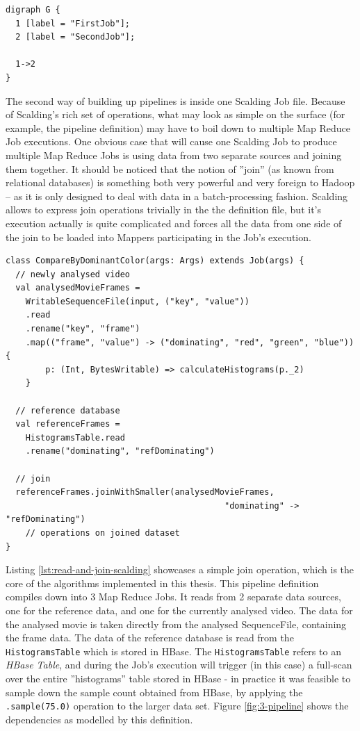 \newpage
\begin{lstlisting}[caption={Textual description of graph on Figure \ref{fig:simplest-pipeline}, using the DOT graph description language.}, label={lst:simplest-pipeline-dot}]
digraph G {
  1 [label = "FirstJob"];
  2 [label = "SecondJob"];
  
  1->2
}
\end{lstlisting}

The second way of building up pipelines is inside one Scalding Job file. Because of Scalding's rich set of operations, what may look as simple on the surface (for example, the pipeline definition) may have to boil down to multiple Map Reduce Job executions. One obvious case that will cause one Scalding Job to produce multiple Map Reduce Jobs is using data from two separate sources and joining them together. It should be noticed that the notion of ''join'' (as known from relational databases) is something both very powerful and very foreign to Hadoop -- as it is only designed to deal with data in a batch-processing fashion. Scalding allows to express join operations trivially in the the definition file, but it's execution actually is quite complicated and forces all the data from one side of the join to be loaded into Mappers participating in the Job's execution.

\begin{lstlisting}[caption={Scalding job, reading data from 2 sources and joining them on dominantColor, producing 3 Map Reduce Jobs}, label={lst:read-and-join-scalding}]
class CompareByDominantColor(args: Args) extends Job(args) {
  // newly analysed video
  val analysedMovieFrames = 
    WritableSequenceFile(input, ("key", "value"))
    .read
    .rename("key", "frame")
    .map(("frame", "value") -> ("dominating", "red", "green", "blue")) { 
        p: (Int, BytesWritable) => calculateHistograms(p._2)
    }
  
  // reference database
  val referenceFrames = 
    HistogramsTable.read
    .rename("dominating", "refDominating")

  // join
  referenceFrames.joinWithSmaller(analysedMovieFrames, 
                                            "dominating" -> "refDominating")
    // operations on joined dataset
}
\end{lstlisting}

Listing \ref{lst:read-and-join-scalding} showcases a simple join operation, which is the core of the algorithms implemented in this thesis. This pipeline definition compiles down into 3 Map Reduce Jobs. It reads from 2 separate data sources, one for the reference data, and one for the currently analysed video. The data for the analysed movie is taken directly from the analysed SequenceFile, containing the frame data. The data of the reference database is read from the \verb|HistogramsTable| which is stored in HBase. The \verb|HistogramsTable| refers to an \textit{HBase Table}, and during the Job's execution will trigger (in this case) a full-scan over the entire ''histograms'' table stored in HBase - in practice it was feasible to sample down the sample count obtained from HBase, by applying the \verb|.sample(75.0)| operation to the larger data set. Figure \ref{fig:3-pipeline} shows the dependencies as modelled by this definition.

